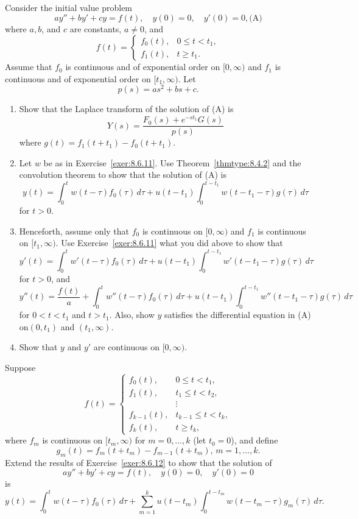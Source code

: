 \documentclass{ximera}
\begin{document}
\begin{problem}\label{exer:8.6.12}
Consider the initial value problem
$$
ay''+by'+cy=f(t),\quad y(0)=0,\quad y'(0)=0,
\text{(A)}
$$
where $a,b$, and $c$ are constants, $a\ne0$, and
$$
f(t)=\left\{\begin{array}{cc}f_0(t),&0\le t<t_1,\\
f_1(t),&t\ge t_1.\end{array}\right.
$$
Assume that $f_0$ is continuous and of exponential order on $[0,\infty)$
and $f_1$ is continuous and of exponential order on $[t_1,\infty)$.
Let
$$
p(s)=as^2+bs+c.
$$
\begin{enumerate}
\item %
Show that the Laplace transform of the solution of  (A)
is
$$
Y(s)=\frac{F_0(s)+e^{-st_1}G(s)}{p(s)}
$$
where  $g(t)=f_1(t+t_1)-f_0(t+t_1)$.
\item %
Let $w$ be as in Exercise~\ref{exer:8.6.11}.
Use Theorem~\ref{thmtype:8.4.2} and the convolution theorem
to show that the solution of (A) is
$$
y(t)=\int_0^t
w(t-\tau)f_0(\tau)\,d\tau+u(t-t_1)\int_0^{t-t_1}
w(t-t_1-\tau)g(\tau)\,d\tau
$$
for $t>0$.
\item %
Henceforth, assume only that $f_0$ is continuous on $[0,\infty)$ and $f_1$
 is continuous on $[t_1,\infty)$.
 Use  Exercise~\ref{exer:8.6.11} what you did above to show that
$$
y'(t)=\int_0^t
w'(t-\tau)f_0(\tau)\,d\tau+u(t-t_1)\int_0^{t-t_1}
w'(t-t_1-\tau)g(\tau)\,d\tau
$$
for $t>0$, and
$$
y''(t)=\frac{f(t)}{a}+\int_0^t
w''(t-\tau)f_0(\tau)\,d\tau+u(t-t_1)\int_0^{t-t_1}
w''(t-t_1-\tau)g(\tau)\,d\tau
$$
for $0<t<t_1$ and $t>t_1$. Also, show
 $y$ satisfies the differential equation in
(A) on$(0,t_1)$ and $(t_1,\infty)$.
\item %
Show that $y$ and $y'$ are continuous on $[0,\infty)$.
\end{enumerate}
\end{problem}

\begin{problem}\label{exer:8.6.13}
Suppose
$$
f(t)=\left\{\begin{array}{cl}
 f_0(t),&0\le t < t_1,\\[5pt]
 f_1(t),&t_1\le t < t_2,\\
&\vdots\\
f_{k-1}(t),&t_{k-1}\le t < t_k,\\
 f_k(t),&t\ge t_k,
\end{array}\right.
$$
where  $f_m$ is continuous on $[t_m,\infty)$ for $m=0,\dots,k$
(let $t_0=0$),  and define
$$
g_m(t)=f_m(t+t_m)-f_{m-1}(t+t_m) ,\, m=1,\dots,k.
$$
Extend the results of Exercise~\ref{exer:8.6.12} to show that
the solution of
$$
ay''+by'+cy=f(t),\quad y(0)=0,\quad y'(0)=0
$$
is
$$
y(t)=\int_0^t w(t-\tau)f_0(\tau)\,d\tau+\sum_{m=1}^ku(t-t_m)
\int_0^{t-t_m}w(t-t_m-\tau)g_m(\tau)\,d\tau.
$$
\end{problem}
\end{document}
